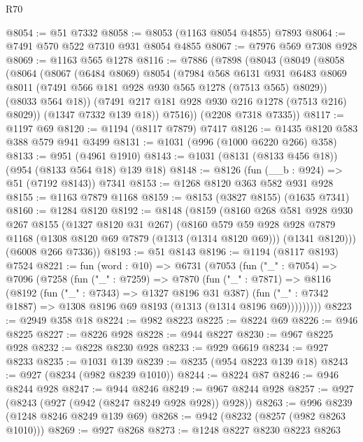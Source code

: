 \begin{lexlean}{R70}
\begin{coremodule}
@8054 := @51 @7332
@8058 := @8053 (@1163 @8054 @4855) @7893
@8064 := @7491 @570 @522 @7310 @931 @8054 @4855
@8067 := @7976 @569 @7308 @928
@8069 := @1163 @565 @1278
@8116 := @7886
    (@7898
      (@8043
        (@8049
          (@8058
            (@8064
              (@8067
                (@6484 @8069)
                @8054
                (@7984
                  @568
                  @6131
                  @931
                  @6483
                  @8069
                  @8011
                  (@7491 @566 @181 @928 @930 @565 @1278 (@7513 @565) @8029))
                (@8033 @564 @18))
              (@7491 @217 @181 @928 @930 @216 @1278 (@7513 @216) @8029))
            (@1347 @7332 @139 @18))
          @7516))
      (@2208 @7318 @7335))
@8117 := @1197 @69
@8120 := @1194 (@8117 @7879) @7417
@8126 := @1435 @8120 @583 @388 @579 @941 @3499
@8131 := @1031 (@996 (@1000 @6220 @266) @358)
@8133 := @951 (@4961 @1910)
@8143 := @1031 (@8131 (@8133 @456 @18)) (@954 (@8133 @564 @18) @139 @18)
@8148 := @8126 (fun (__b : @924) => @51 (@7192 @8143)) @7341
@8153 := @1268 @8120 @363 @582 @931 @928
@8155 := @1163 @7879 @1168
@8159 := @8153 (@3827 @8155) (@1635 @7341)
@8160 := @1284 @8120
@8192 := @8148
    (@8159
      (@8160
        @268
        @581
        @928
        @930
        @267
        @8155
        (@1327 @8120 @31 @267)
        (@8160
          @579
          @59
          @928
          @928
          @7879
          @1168
          (@1308 @8120 @69 @7879 (@1313 (@1314 @8120 @69)))
          (@1341 @8120)))
      (@6008 @266 @7336))
@8193 := @51 @8143
@8196 := @1194 (@8117 @8193) @7524
@8221 := fun (word : @10) =>
  @6731
    (@7053
      (fun ("_" : @7054) =>
      @7096
        (@7258
          (fun ("_" : @7259) =>
          @7870
            (fun ("_" : @7871) =>
            @8116
              (@8192
                (fun ("_" : @7343) => @1327 @8196 @31 @387)
                (fun ("_" : @7342 @1887) => @1308 @8196 @69 @8193 (@1313 (@1314 @8196 @69)))))))))
@8223 := @2949 @358 @18
@8224 := @982 @8223
@8225 := @8224 @69
@8226 := @946 @8225
@8227 := @8226 @928
@8228 := @944 @8227
@8230 := @967 @8225 @928
@8232 := @8228 @8230 @928
@8233 := @929 @6619
@8234 := @927 @8233
@8235 := @1031 @139
@8239 := @8235 (@954 @8223 @139 @18)
@8243 := @927 (@8234 (@982 @8239 @1010))
@8244 := @8224 @87
@8246 := @946 @8244 @928
@8247 := @944 @8246
@8249 := @967 @8244 @928
@8257 := @927 (@8243 (@927 (@942 (@8247 @8249 @928 @928)) @928))
@8263 := @996 @8239 (@1248 @8246 @8249 @139 @69)
@8268 := @942 (@8232 (@8257 (@982 @8263 @1010)))
@8269 := @927 @8268
@8273 := @1248 @8227 @8230 @8223 @8263

\end{coremodule}
\end{lexlean}
